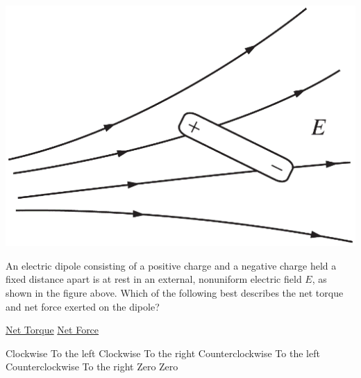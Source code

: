 
\begin{center}
    \includegraphics[scale=0.3]{images/img-003-002.png}
\end{center}

\begin{questions}
\setcounter{question}{3}

\question
An electric dipole consisting of a positive charge and a negative charge held a fixed distance apart is at rest in an external, nonuniform electric field $E$, as shown in the figure above. Which of the following best describes the net torque and net force exerted on the dipole?

\tabto{0.75cm} \underline{Net Torque}
\tabto{5cm}    \underline{Net Force}

\begin{choices}
    \choice Clockwise        \tabto{4.25cm} To the left
    \choice Clockwise        \tabto{4.25cm} To the right
    \choice Counterclockwise \tabto{4.25cm} To the left
    \choice Counterclockwise \tabto{4.25cm} To the right
    \choice Zero             \tabto{4.25cm} Zero
\end{choices}

\end{questions}
